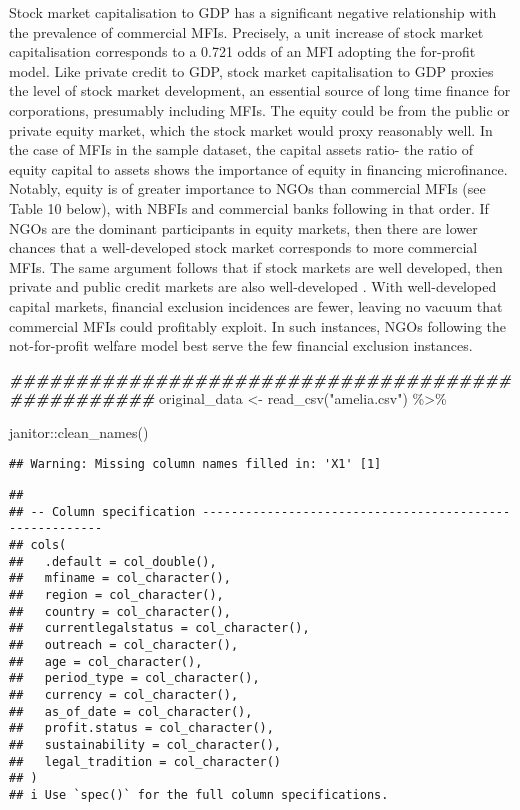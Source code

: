 \documentclass[a4paper,nobind]{templates/ociamthesis}
\newenvironment{Shaded}{\begin{snugshade}}{\end{snugshade}}
\newcommand{\DocumentationTok}[1]{\textcolor[rgb]{0.56,0.35,0.01}{\textbf{\textit{#1}}}}
\newcommand{\FunctionTok}[1]{\textcolor[rgb]{0.00,0.00,0.00}{#1}}
\newcommand{\NormalTok}[1]{#1}
\newcommand{\OtherTok}[1]{\textcolor[rgb]{0.56,0.35,0.01}{#1}}
\newcommand{\SpecialCharTok}[1]{\textcolor[rgb]{0.00,0.00,0.00}{#1}}
\newcommand{\StringTok}[1]{\textcolor[rgb]{0.31,0.60,0.02}{#1}}
\renewenvironment{Shaded}
{
  \vspace{10pt}%
  \begin{snugshade}%
}{%
  \end{snugshade}%
  \vspace{8pt}%
}
\begin{document}
Stock market capitalisation to GDP has a significant negative relationship with the prevalence of commercial MFIs. Precisely, a unit increase of stock market capitalisation corresponds to a 0.721 odds of an MFI adopting the for-profit model. Like private credit to GDP, stock market capitalisation to GDP proxies the level of stock market development, an essential source of long time finance for corporations, presumably including MFIs. The equity could be from the public or private equity market, which the stock market would proxy reasonably well. In the case of MFIs in the sample dataset, the capital assets ratio- the ratio of equity capital to assets shows the importance of equity in financing microfinance. Notably, equity is of greater importance to NGOs than commercial MFIs (see Table 10 below), with NBFIs and commercial banks following in that order. If NGOs are the dominant participants in equity markets, then there are lower chances that a well-developed stock market corresponds to more commercial MFIs. The same argument follows that if stock markets are well developed, then private and public credit markets are also well-developed \autocite{schnyder2018twenty}. With well-developed capital markets, financial exclusion incidences are fewer, leaving no vacuum that commercial MFIs could profitably exploit. In such instances, NGOs following the not-for-profit welfare model best serve the few financial exclusion instances.

\begin{Shaded}
\begin{Highlighting}[]
\DocumentationTok{\#\#\#\#\#\#\#\#\#\#\#\#\#\#\#\#\#\#\#\#\#\#\#\#\#\#\#\#\#\#\#\#\#\#\#\#\#\#\#\#\#\#\#\#\#\#\#\#\#}
\NormalTok{original\_data }\OtherTok{\textless{}{-}} \FunctionTok{read\_csv}\NormalTok{(}\StringTok{"amelia.csv"}\NormalTok{) }\SpecialCharTok{\%\textgreater{}\%} 
  
\NormalTok{  janitor}\SpecialCharTok{::}\FunctionTok{clean\_names}\NormalTok{() }
\end{Highlighting}
\end{Shaded}

\begin{verbatim}
## Warning: Missing column names filled in: 'X1' [1]
\end{verbatim}

\begin{verbatim}
## 
## -- Column specification --------------------------------------------------------
## cols(
##   .default = col_double(),
##   mfiname = col_character(),
##   region = col_character(),
##   country = col_character(),
##   currentlegalstatus = col_character(),
##   outreach = col_character(),
##   age = col_character(),
##   period_type = col_character(),
##   currency = col_character(),
##   as_of_date = col_character(),
##   profit.status = col_character(),
##   sustainability = col_character(),
##   legal_tradition = col_character()
## )
## i Use `spec()` for the full column specifications.
\end{verbatim}
\end{document}
